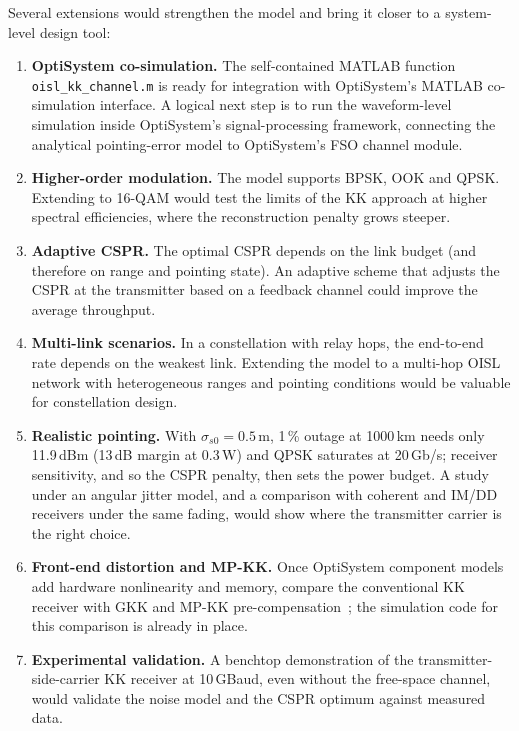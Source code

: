 Several extensions would strengthen the model and bring it closer to a system-level design tool:

\begin{enumerate}
\item \textbf{OptiSystem co-simulation.} The self-contained MATLAB function \texttt{oisl\_kk\_channel.m} is ready for integration with OptiSystem's MATLAB co-simulation interface. A logical next step is to run the waveform-level simulation inside OptiSystem's signal-processing framework, connecting the analytical pointing-error model to OptiSystem's FSO channel module.

\item \textbf{Higher-order modulation.} The model supports BPSK, OOK and QPSK. Extending to 16-QAM would test the limits of the KK approach at higher spectral efficiencies, where the reconstruction penalty grows steeper.

\item \textbf{Adaptive CSPR.} The optimal CSPR depends on the link budget (and therefore on range and pointing state). An adaptive scheme that adjusts the CSPR at the transmitter based on a feedback channel could improve the average throughput.

\item \textbf{Multi-link scenarios.} In a constellation with relay hops, the end-to-end rate depends on the weakest link. Extending the model to a multi-hop OISL network with heterogeneous ranges and pointing conditions would be valuable for constellation design.

\item \textbf{Realistic pointing.} With $\sigma_{s0}=0.5$\,m, 1\,\% outage at 1000\,km needs only 11.9\,dBm (13\,dB margin at 0.3\,W) and QPSK saturates at 20\,Gb/s; receiver sensitivity, and so the CSPR penalty, then sets the power budget. A study under an angular jitter model, and a comparison with coherent and IM/DD receivers under the same fading, would show where the transmitter carrier is the right choice.

\item \textbf{Front-end distortion and MP-KK.} Once OptiSystem component models add hardware nonlinearity and memory, compare the conventional KK receiver with GKK and MP-KK pre-compensation~\cite{wen2023}; the simulation code for this comparison is already in place.

\item \textbf{Experimental validation.} A benchtop demonstration of the transmitter-side-carrier KK receiver at 10\,GBaud, even without the free-space channel, would validate the noise model and the CSPR optimum against measured data.
\end{enumerate}
